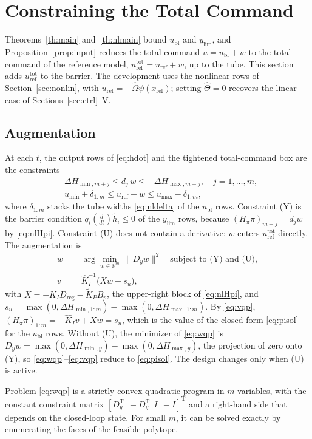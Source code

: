 \documentclass[lettersize,journal]{IEEEtran}
\newcommand{\Kh}{\hat{K}}
\newcommand{\xr}{x_{\mathrm{ref}}}
\newcommand{\ub}{u_{\mathrm{bl}}}
\newcommand{\uref}{u_{\mathrm{ref}}}
\newcommand{\utot}{u_{\mathrm{ref}}^{\mathrm{tot}}}
\newcommand{\ylim}{y_{\mathrm{lim}}}
\newcommand{\Dreg}{D_{\mathrm{reg}}}
\newcommand{\T}{\mathrm{T}}
\newcommand{\R}{\mathbb{R}}
\begin{document}
\section{Constraining the Total Command} \label{sec:total}

Theorems~\ref{th:main} and~\ref{th:nlmain} bound $\ub$ and $\ylim$, and Proposition~\ref{prop:input} reduces the total command $u=\ub+w$ to the total command of the reference model, $\utot=\uref+w$, up to the tube. This section adds $\utot$ to the barrier. The development uses the nonlinear rows of Section~\ref{sec:nonlin}, with $\uref=-\hat\Omega\psi(\xr)$; setting $\hat\Theta=0$ recovers the linear case of Sections~\ref{sec:ctrl}--V.

\subsection{Augmentation}

At each $t$, the output rows of \eqref{eq:hdot} and the tightened total-command box are the constraints
\begin{align}
&\Delta H_{\min,m+j}\le d_j\,w\le-\Delta H_{\max,m+j},\quad j=1,\dots,m, \tag{Y}\\
&u_{\min}+\delta_{1:m}\le\uref+w\le u_{\max}-\delta_{1:m}, \tag{U}
\end{align}
where $\delta_{1:m}$ stacks the tube widths \eqref{eq:nldelta} of the $\ub$ rows. Constraint (Y) is the barrier condition $q_i(\frac{d}{dt})\tilde h_i\le0$ of the $\ylim$ rows, because $(H_\pi\pi)_{m+j}=d_jw$ by \eqref{eq:nlHpi}. Constraint (U) does not contain a derivative: $w$ enters $\utot$ directly. The augmentation is
\begin{align}
w &= \arg\min_{w\in\R^m}\ \|D_yw\|^2\quad\text{subject to (Y) and (U)}, \label{eq:wqp}\\
v &= \Kh_I^{-1}\big(Xw-s_u\big), \label{eq:vqp}
\end{align}
with $X=-\Kh_I\Dreg-\tilde K_PB_p$, the upper-right block of \eqref{eq:nlHpi}, and $s_u=\max(0,\Delta H_{\min,1:m})-\max(0,\Delta H_{\max,1:m})$. By \eqref{eq:vqp}, $(H_\pi\pi)_{1:m}=-\Kh_Iv+Xw=s_u$, which is the value of the closed form \eqref{eq:pisol} for the $\ub$ rows. Without (U), the minimizer of \eqref{eq:wqp} is $D_yw=\max(0,\Delta H_{\min,y})-\max(0,\Delta H_{\max,y})$, the projection of zero onto (Y), so \eqref{eq:wqp}--\eqref{eq:vqp} reduce to \eqref{eq:pisol}. The design changes only when (U) is active.

Problem \eqref{eq:wqp} is a strictly convex quadratic program in $m$ variables, with the constant constraint matrix $[D_y^\T\ \ -D_y^\T\ \ I\ \ -I]^\T$ and a right-hand side that depends on the closed-loop state. For small $m$, it can be solved exactly by enumerating the faces of the feasible polytope.
\end{document}
